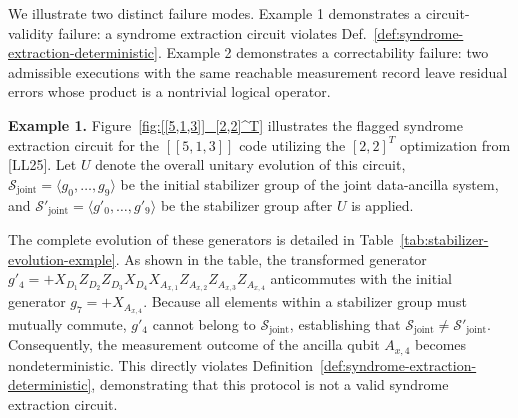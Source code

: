 \documentclass[acmsmall,screen,review,anonymous,nonacm]{acmart}
\begin{document}
 
We illustrate two distinct failure modes.
Example 1 demonstrates a circuit-validity failure: a syndrome extraction
circuit violates Def.~\ref{def:syndrome-extraction-deterministic}.
Example 2 demonstrates a correctability failure: two admissible
executions with the same reachable measurement record leave residual
errors whose product is a nontrivial logical operator.


\textbf{Example 1.} Figure~\ref{fig:[[5,1,3]]_[2,2]^T} illustrates the flagged syndrome extraction circuit for the $[[5,1,3]]$ code utilizing the $[2,2]^T$ optimization from [LL25]. Let $U$ denote the overall unitary evolution of this circuit, 
$\mathcal{S}_{\mathrm{joint}} = \langle g_0, \dots, g_9 \rangle$ be the initial stabilizer
group of the joint data-ancilla system, and $\mathcal{S}'_{\mathrm{joint}} = \langle g'_0, \dots, g'_9 \rangle$ be the stabilizer
group after $U$ is applied.

The complete evolution of these generators is detailed in Table~\ref{tab:stabilizer-evolution-exmple}. As shown in the table, the transformed generator $g'_4 = +X_{D_1} Z_{D_2} Z_{D_3} X_{D_4}X_{A_{x,1}} Z_{A_{x,2}} Z_{A_{x,3}} Z_{A_{x,4}}$ anticommutes with the initial generator $g_7= +X_{A_{x,4}}$. Because all elements within a stabilizer group must mutually commute, $g'_4$ cannot belong to $\mathcal{S}_{\mathrm{joint}}$, establishing that $\mathcal{S}_{\mathrm{joint}} \neq \mathcal{S}'_{\mathrm{joint}}$. Consequently, the measurement outcome of the ancilla qubit $A_{x,4}$ becomes nondeterministic. This directly violates Definition~\ref{def:syndrome-extraction-deterministic}, demonstrating that this protocol is not a valid syndrome extraction circuit.

\end{document}
